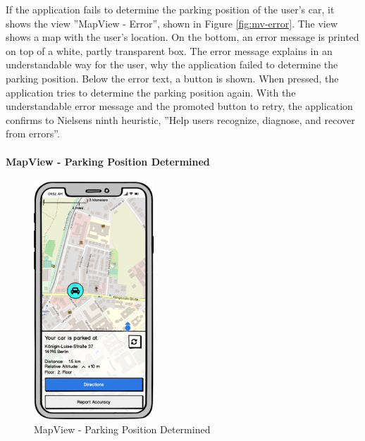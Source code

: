 If the application fails to determine the parking position of the user's car, it shows the view ''MapView - Error'', shown in Figure \ref{fig:mv-error}. The view shows a map with the user's location. On the bottom, an error message is printed on top of a white, partly transparent box. The error message explains in an understandable way for the user, why the application failed to determine the parking position. Below the error text, a button is shown. When pressed, the application tries to determine the parking position again. With the understandable error message and the promoted button to retry, the application confirms to Nielsens ninth heuristic, ''Help users recognize, diagnose, and recover from errors''. \cite{nielsen1994usability}

\paragraph{MapView - Parking Position Determined}

\begin{figure}[h]
    \centering
    \includegraphics[width=0.4\textwidth]{images/UI/Iteration4-MapView-ParkingPositionDetermined.png}
    \caption{MapView - Parking Position Determined}
    \label{fig:mv-parking}
\end{figure}

